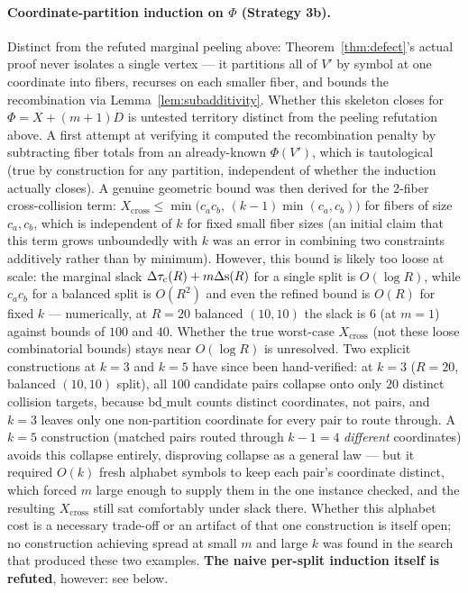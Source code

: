 \paragraph{Coordinate-partition induction on $\Phi$ (Strategy 3b).}
Distinct from the refuted marginal peeling above: Theorem~\ref{thm:defect}'s
actual proof never isolates a single vertex — it partitions all of $V'$
by symbol at one coordinate into fibers, recurses on each smaller fiber,
and bounds the recombination via Lemma~\ref{lem:subadditivity}. Whether
this skeleton closes for $\Phi=X+(m+1)D$ is untested territory distinct
from the peeling refutation above. A first attempt at verifying it
computed the recombination penalty by subtracting fiber totals from an
already-known $\Phi(V')$, which is tautological (true by construction for
any partition, independent of whether the induction actually closes). A
genuine geometric bound was then derived for the 2-fiber cross-collision
term: $X_{\text{cross}} \le \min\big(c_ac_b,\,(k-1)\min(c_a,c_b)\big)$ for
fibers of size $c_a,c_b$, which is independent of $k$ for fixed small
fiber sizes (an initial claim that this term grows unboundedly with $k$
was an error in combining two constraints additively rather than by
minimum). However, this bound is likely too loose at scale: the marginal
slack $\Delta\tau_{\mathrm{c}}(R)+m\Delta\mathrm{s}(R)$ for a single split is
$O(\log R)$, while $c_ac_b$ for a balanced split is $O(R^2)$ and even the
refined bound is $O(R)$ for fixed $k$ — numerically, at $R=20$ balanced
$(10,10)$ the slack is $6$ (at $m=1$) against bounds of $100$ and $40$.
Whether the true worst-case $X_{\text{cross}}$ (not these loose
combinatorial bounds) stays near $O(\log R)$ is unresolved. Two explicit
constructions at $k=3$ and $k=5$ have since been hand-verified: at $k=3$
($R=20$, balanced $(10,10)$ split), all $100$ candidate pairs collapse
onto only $20$ distinct collision targets, because $\mathrm{bd\_mult}$
counts distinct coordinates, not pairs, and $k=3$ leaves only one
non-partition coordinate for every pair to route through. A $k=5$
construction (matched pairs routed through $k-1=4$ \emph{different}
coordinates) avoids this collapse entirely, disproving collapse as a
general law — but it required $O(k)$ fresh alphabet symbols to keep each
pair's coordinate distinct, which forced $m$ large enough to supply them
in the one instance checked, and the resulting $X_{\text{cross}}$ still
sat comfortably under slack there. Whether this alphabet cost is a
necessary trade-off or an artifact of that one construction is itself
open; no construction achieving spread at small $m$ and large $k$ was
found in the search that produced these two examples. \textbf{The naive
per-split induction itself is refuted}, however: see below.

